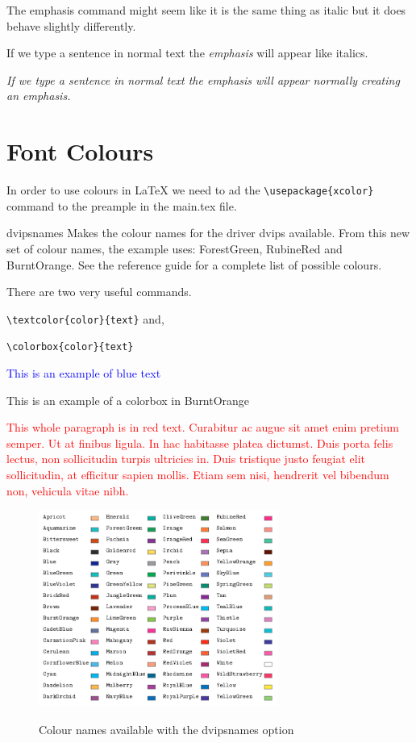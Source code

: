 \vspace{0.4cm}

The emphasis command might seem like it is the same thing as italic but it does behave slightly differently. 

If we type a sentence in normal text the \emph{emphasis} will appear like italics.

\textit{If we type a sentence in normal text the \emph{emphasis} will appear normally creating an emphasis.}

\newpage

\section{Font Colours}

In order to use colours in LaTeX we need to ad the \verb|\usepackage{xcolor}| command to the preample in the main.tex file. 

dvipsnames Makes the colour names for the driver dvips available. From this new set of colour names, the example uses: ForestGreen, RubineRed and BurntOrange. See the reference guide for a complete list of possible colours.

There are two very useful commands. 

\verb|\textcolor{color}{text}| and, 

\verb|\colorbox{color}{text}|

\textcolor{blue}{This is an example of blue text}

\colorbox{BurntOrange}{This is an example of a colorbox in BurntOrange}

\textcolor{red}{This whole paragraph is in red text. Curabitur ac augue sit amet enim pretium semper. Ut at finibus ligula. In hac habitasse platea dictumst. Duis porta felis lectus, non sollicitudin turpis ultricies in. Duis tristique justo feugiat elit sollicitudin, at efficitur sapien mollis. Etiam sem nisi, hendrerit vel bibendum non, vehicula vitae nibh.}

\vspace{0.4cm}

\begin{figure}[h]
\centering
\includegraphics[width=0.7\textwidth]{images/ColoursEx6.png}
\caption{Colour names available with the dvipsnames option}
\label{fig:x Color options} \parencite{overleaf01}
\end{figure}


